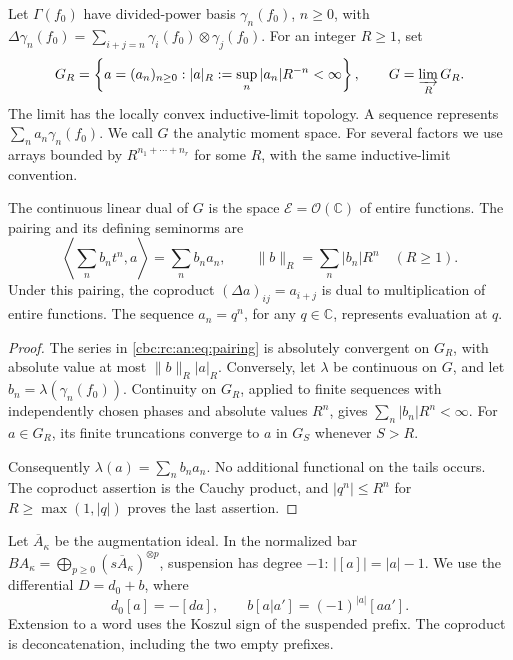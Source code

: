 Let \(\Gamma(f_0)\) have divided-power basis \(\gamma_n(f_0)\),
\(n\geq0\), with
\(\Delta\gamma_n(f_0)=\sum_{i+j=n}\gamma_i(f_0)\otimes
\gamma_j(f_0)\). For an integer \(R\geq1\), set
\[
 G_R=\left\{a=(a_n)_{n\geq0}:
       |a|_R:=\sup_n |a_n|R^{-n}<\infty\right\},
 \qquad G=\varinjlim_R G_R.
\]
The limit has the locally convex inductive-limit topology. A sequence
represents \(\sum_n a_n\gamma_n(f_0)\). We call \(G\) the analytic moment space. For several
factors we use arrays bounded by \(R^{n_1+\cdots+n_r}\) for some
\(R\), with the same inductive-limit convention.

\begin{lemma}\label{cbc:rc:an:lem:entire}
The continuous linear dual of \(G\) is the space
\(\mathcal E=\mathcal O(\mathbb C)\) of entire functions. The pairing
and its defining seminorms are
\begin{equation}\label{cbc:rc:an:eq:pairing}
 \left\langle\sum_n b_n t^n,a\right\rangle
       =\sum_n b_na_n,
 \qquad \|b\|_R=\sum_n |b_n|R^n\quad(R\geq1).
\end{equation}
Under this pairing, the coproduct \((\Delta a)_{ij}=a_{i+j}\)
is dual to multiplication of entire functions. The sequence
\(a_n=q^n\), for any \(q\in\mathbb C\), represents evaluation at
\(q\).
\end{lemma}
\begin{proof}
The series in \eqref{cbc:rc:an:eq:pairing} is absolutely convergent on
\(G_R\), with absolute value at most \(\|b\|_R|a|_R\).
Conversely, let \(\lambda\) be continuous on \(G\), and let
\(b_n=\lambda(\gamma_n(f_0))\). Continuity on \(G_R\), applied to
finite sequences with independently chosen phases and absolute values
\(R^n\), gives \(\sum_n|b_n|R^n<\infty\). For \(a\in G_R\), its
finite truncations converge to \(a\) in \(G_S\) whenever \(S>R\).

Consequently \(\lambda(a)=\sum_n b_na_n\). No additional functional
on the tails occurs. The coproduct assertion is the Cauchy product,
and \(|q^n|\leq R^n\) for \(R\geq\max(1,|q|)\) proves the last
assertion.
\end{proof}

Let \(\overline A_\kappa\) be the augmentation ideal. In the normalized
bar \(BA_\kappa=\bigoplus_{p\geq0}(s\overline A_\kappa)^{\otimes p}\),
suspension has degree \(-1\): \(|[a]|=|a|-1\).
We use the differential \(D=d_0+b\), where
\[
 d_0[a]=- [da],\qquad b[a|a']=(-1)^{|a|}[aa'].
\]
Extension to a word uses the Koszul sign of the suspended prefix.
The coproduct is deconcatenation, including the two empty prefixes.

